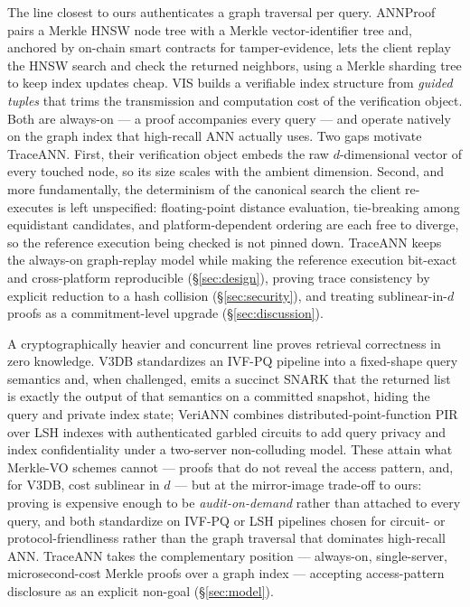 \documentclass[11pt]{article}
\newcommand{\sys}{TraceANN}
\begin{document}
The line closest to ours authenticates a graph traversal per query.
ANNProof \cite{annproof2024} pairs a Merkle HNSW node tree with a Merkle
vector-identifier tree and, anchored by on-chain smart contracts for
tamper-evidence, lets the client replay the HNSW search and check the
returned neighbors, using a Merkle sharding tree to keep index updates
cheap. VIS \cite{vis2024} builds a verifiable index structure from
\emph{guided tuples} that trims the transmission and computation cost of
the verification object. Both are always-on --- a proof accompanies
every query --- and operate natively on the graph index that high-recall
ANN actually uses. Two gaps motivate \sys{}. First, their verification
object embeds the raw $d$-dimensional vector of every touched node, so
its size scales with the ambient dimension. Second, and more
fundamentally, the determinism of the canonical search the client
re-executes is left unspecified: floating-point distance evaluation,
tie-breaking among equidistant candidates, and platform-dependent
ordering are each free to diverge, so the reference execution being
checked is not pinned down. \sys{} keeps the always-on graph-replay
model while making the reference execution bit-exact and cross-platform
reproducible (\S\ref{sec:design}), proving trace consistency by explicit
reduction to a hash collision (\S\ref{sec:security}), and treating
sublinear-in-$d$ proofs as a commitment-level upgrade
(\S\ref{sec:discussion}).

A cryptographically heavier and concurrent line proves retrieval
correctness in zero knowledge. V3DB \cite{v3db2026} standardizes an
IVF-PQ pipeline into a fixed-shape query semantics and, when challenged,
emits a succinct SNARK that the returned list is exactly the output of
that semantics on a committed snapshot, hiding the query and private
index state; VeriANN \cite{veriann2026} combines
distributed-point-function PIR over LSH indexes with authenticated
garbled circuits to add query privacy and index confidentiality under a
two-server non-colluding model. These attain what Merkle-VO schemes
cannot --- proofs that do not reveal the access pattern, and, for V3DB,
cost sublinear in $d$ --- but at the mirror-image trade-off to ours:
proving is expensive enough to be \emph{audit-on-demand} rather than
attached to every query, and both standardize on IVF-PQ or LSH pipelines
chosen for circuit- or protocol-friendliness rather than the graph
traversal that dominates high-recall ANN. \sys{} takes the complementary
position --- always-on, single-server, microsecond-cost Merkle proofs
over a graph index --- accepting access-pattern disclosure as an
explicit non-goal (\S\ref{sec:model}).
\end{document}
